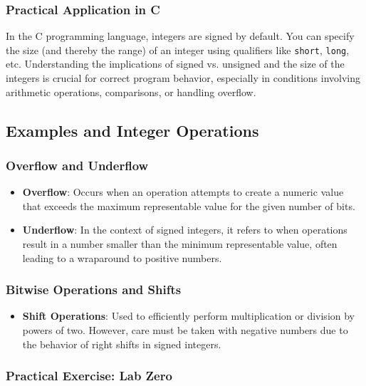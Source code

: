 \documentclass{article}
\begin{document}
\subsubsection{Practical Application in C}

In the C programming language, integers are signed by default. You can specify the size (and thereby the range) of an integer using qualifiers like \texttt{short}, \texttt{long}, etc. Understanding the implications of signed vs. unsigned and the size of the integers is crucial for correct program behavior, especially in conditions involving arithmetic operations, comparisons, or handling overflow.

\subsection{Examples and Integer Operations}

\subsubsection{Overflow and Underflow}

\begin{itemize}
    \item \textbf{Overflow}: Occurs when an operation attempts to create a numeric value that exceeds the maximum representable value for the given number of bits.
    
    \item \textbf{Underflow}: In the context of signed integers, it refers to when operations result in a number smaller than the minimum representable value, often leading to a wraparound to positive numbers.
\end{itemize}

\subsubsection{Bitwise Operations and Shifts}

\begin{itemize}
    \item \textbf{Shift Operations}: Used to efficiently perform multiplication or division by powers of two. However, care must be taken with negative numbers due to the behavior of right shifts in signed integers.
\end{itemize}

\subsubsection{Practical Exercise: Lab Zero}
\end{document}
